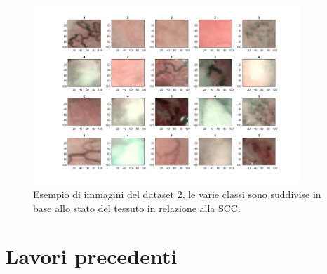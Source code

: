 \begin{figure}[ht]
    \centering
    \includegraphics[width=0.9\textwidth]{introduzione/dataset-2-ml.JPG}
    \caption{Esempio di immagini del dataset 2, le varie classi sono suddivise in base allo stato del tessuto in relazione alla SCC.}
    \label{fig:dataset2ml}
\end{figure}

\section{Lavori precedenti}\label{lavori-precedenti}